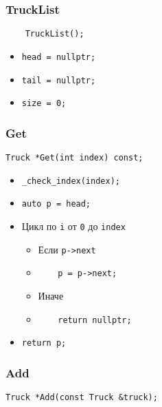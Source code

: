 \subsubsection*{TruckList}

\begin{lstlisting}
    TruckList();
\end{lstlisting}

\begin{itemize}
    \item \verb|head = nullptr;|
    \item \verb|tail = nullptr;|
    \item \verb|size = 0;|
\end{itemize}


\subsubsection*{Get}

\begin{lstlisting}
Truck *Get(int index) const;
\end{lstlisting}

\begin{itemize}
	\item \verb|_check_index(index);|
	\item \verb|auto p = head;|
	\item Цикл по \verb|i| от \verb|0| до \verb|index|
	\begin{itemize}
		\item Если \verb|p->next|
		\item \verb|    p = p->next;|
		\item Иначе
		\item \verb|    return nullptr;|
	\end{itemize}
	\item \verb|return p;|
\end{itemize}


\subsubsection*{Add}

\begin{lstlisting}
Truck *Add(const Truck &truck);
\end{lstlisting}

